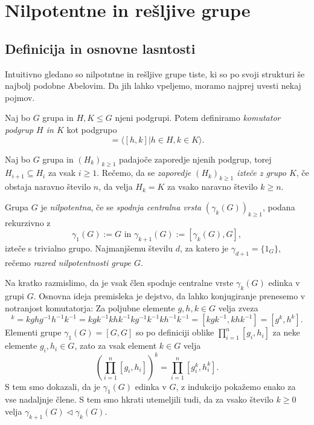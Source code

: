 \section{Nilpotentne in rešljive grupe}

\subsection{Definicija in osnovne lasntosti}

Intuitivno gledano so nilpotntne in rešljive grupe tiste, ki so po svoji strukturi še najbolj podobne Abelovim. Da jih lahko vpeljemo, moramo najprej uvesti nekaj pojmov.
\begin{definicija}\label{def_komutator_grup}
    Naj bo $G$ grupa in $H, K \le G$ njeni podgrupi. Potem definiramo \emph{komutator podgrup $H$ in $K$} kot podgrupo \begin{equation*}
        [H, K]  = \langle [h, k] | h \in H, k \in K \rangle.
    \end{equation*}
\end{definicija}

\begin{definicija}
\label{def_iztek_zaporedja}
Naj bo $G$ grupa in $(H_k)_{k \ge 1}$ padajoče zaporedje njenih podgrup, torej $H_{i + 1} \subseteq H_{i}$ za vsak $i \ge 1$. 
Rečemo, da se \emph{zaporedje $(H_k)_{k \ge 1}$ izteče z grupo $K$}, če obstaja naravno število $n$, da velja $H_k = K$ za vsako naravno število $k \ge n$.
\end{definicija}

\begin{definicija}
\label{def_nilpotentna_grupa}
Grupa $G$ je \emph{nilpotentna}, če se \emph{spodnja centralna vrsta} $(\gamma_k(G))_{k \ge 1}$, podana rekurzivno z \begin{equation*}
\gamma_1(G) := G \text{ in } \gamma_{k +1}(G) := [\gamma_k(G), G],
\end{equation*}  
izteče s trivialno grupo. Najmanjšemu številu $d$, za katero je $\gamma_{d + 1} = \{ 1_G \}$, rečemo \emph{razred nilpotentnosti grupe $G$}.    
\end{definicija}

Na kratko razmislimo, da je vsak člen spodnje centralne vrste $\gamma_k(G)$ edinka v grupi $G$. Osnovna ideja premisleka je dejstvo, da lahko konjugiranje prenesemo v notranjost komutatorja: Za poljubne elemente $g, h, k \in G$ velja zveza \begin{equation*}
    [g, h]^k = kghg^{-1}h^{-1}k^{-1} = kgk^{-1}khk^{-1}kg^{-1}k^{-1}kh^{-1}k^{-1} = [kgk^{-1}, khk^{-1}] = [g^k , h^k].
\end{equation*}
Elementi grupe $\gamma_1(G)  = [G , G]$ so po definiciji oblike $\prod_{i = 1}^n [g_i, h_i]$ za neke elemente $g_i, h_i \in G$, zato za vsak element $k \in G$ velja \begin{equation*}
    \left( \prod_{i = 1}^n [g_i, h_i]\right)^k = \prod_{i = 1}^n [g_i^k, h_i^k]. 
\end{equation*}
S tem smo dokazali, da je $\gamma_1(G)$ edinka v $G$, z indukcijo pokažemo enako za vse nadaljnje člene. S tem smo hkrati utemeljili tudi, da za vsako število $k \ge 0$ velja $\gamma_{k+1}(G) \triangleleft \gamma_k(G)$.

